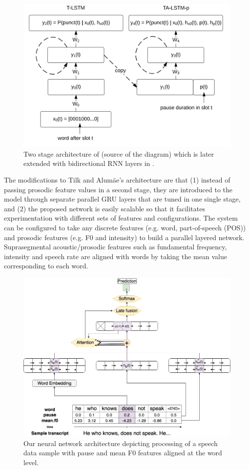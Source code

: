 \begin{figure}[h]
\centering\includegraphics[width=0.65\linewidth]{img/tilk_2stage.png}
\caption{Two stage architecture of \cite{tilk2015lstm} (source of the diagram) which is later extended with bidirectional RNN layers in \cite{tilk2016bidirectional}. }
\label{punkProse:figure:tilk_2stage}
\end{figure}

The modifications to Tilk and Alumäe's architecture are that (1) instead of passing prosodic feature values in a second stage, they are introduced to the model through separate parallel GRU layers that are tuned in one single stage, and (2) the proposed network is easily scalable so that it facilitates experimentation with different sets of features and configurations. The system can be configured to take any discrete features (e.g. word, part-of-speech (POS)) and prosodic features (e.g. F0 and intensity) to build a parallel layered network. Suprasegmental acoustic/prosodic features such as fundamental frequency, intensity and speech rate are aligned with words by taking the mean value corresponding to each word. 

\begin{figure}[h]
\centering\includegraphics[width=\linewidth]{img/parallelRNNet_updated.png}
\caption{Our neural network architecture depicting processing of a speech data sample with pause and mean F0 features aligned at the word level.}
\label{architecture}
\end{figure}

